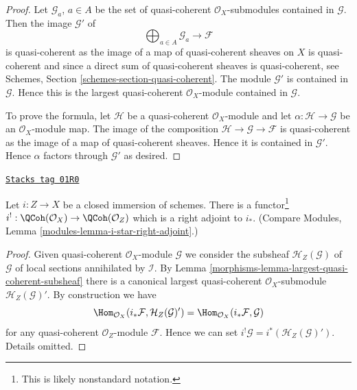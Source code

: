 \begin{proof}
Let $\mathcal{G}_a$, $a \in A$ be the set of quasi-coherent
$\mathcal{O}_X$-submodules contained in $\mathcal{G}$.
Then the image $\mathcal{G}'$ of
$$
\bigoplus\nolimits_{a \in A} \mathcal{G}_a \longrightarrow \mathcal{F}
$$
is quasi-coherent as the image of a map of quasi-coherent sheaves
on $X$ is quasi-coherent and since a direct sum of quasi-coherent sheaves
is quasi-coherent, see
Schemes, Section \ref{schemes-section-quasi-coherent}.
The module $\mathcal{G}'$ is contained in $\mathcal{G}$. Hence this is the
largest quasi-coherent $\mathcal{O}_X$-module contained in $\mathcal{G}$.

\medskip\noindent
To prove the formula, let $\mathcal{H}$ be a quasi-coherent
$\mathcal{O}_X$-module and let $\alpha : \mathcal{H} \to \mathcal{G}$
be an $\mathcal{O}_X$-module map. The image of the composition
$\mathcal{H} \to \mathcal{G} \to \mathcal{F}$ is quasi-coherent
as the image of a map of quasi-coherent sheaves. Hence it is contained
in $\mathcal{G}'$. Hence $\alpha$ factors through $\mathcal{G}'$
as desired.
\end{proof}

\begin{lemma}
\label{morphisms-lemma-i-upper-shriek}
\href{https://stacks.math.columbia.edu/tag/01R0}{\texttt{Stacks tag 01R0}}

Let $i : Z \to X$ be a closed immersion of schemes.
There is a functor\footnote{This is likely nonstandard notation.}
$i^! : \QCoh(\mathcal{O}_X) \to \QCoh(\mathcal{O}_Z)$
which is a right adjoint to $i_*$. (Compare
Modules, Lemma \ref{modules-lemma-i-star-right-adjoint}.)
\end{lemma}

\begin{proof}

Given quasi-coherent $\mathcal{O}_X$-module $\mathcal{G}$ we consider
the subsheaf $\mathcal{H}_Z(\mathcal{G})$ of $\mathcal{G}$ of local sections
annihilated by $\mathcal{I}$. By
Lemma \ref{morphisms-lemma-largest-quasi-coherent-subsheaf}
there is a canonical largest quasi-coherent $\mathcal{O}_X$-submodule
$\mathcal{H}_Z(\mathcal{G})'$. By construction we have
$$
\Hom_{\mathcal{O}_X}(i_*\mathcal{F}, \mathcal{H}_Z(\mathcal{G})')
=
\Hom_{\mathcal{O}_X}(i_*\mathcal{F}, \mathcal{G})
$$
for any quasi-coherent $\mathcal{O}_Z$-module $\mathcal{F}$.
Hence we can set $i^!\mathcal{G} = i^*(\mathcal{H}_Z(\mathcal{G})')$.
Details omitted.
\end{proof}

